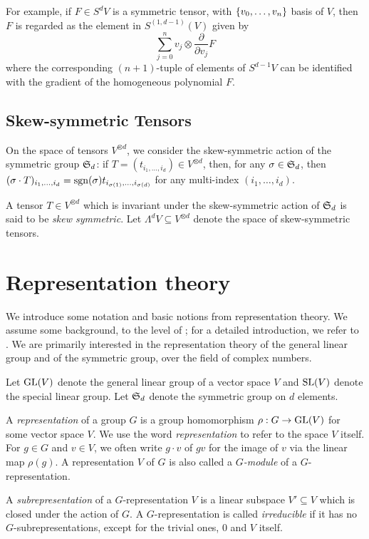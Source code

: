 For example, if $F \in S^d V$ is a symmetric tensor, with $\{v_0 , \ldots , v_n\}$ basis of $V$, then $F$ is regarded as the element in $S^{(1,d-1)}(V)$ given by 
\[
    \sum_{j=0}^n v_j \otimes \textstyle\frac{\partial }{\partial v_j} F
\]
where the corresponding $(n+1)$-tuple of elements of $S^{d-1} V$ can be identified with the gradient of the homogeneous polynomial $F$.

\subsection{Skew-symmetric Tensors}
\label{introduction-subsection-skew_symmetric_tensors}
On the space of tensors $V^{\otimes d}$, we consider the skew-symmetric action of the symmetric group $\mathfrak{S}_d$: if $T = (t_{i_1,\ldots,i_d}) \in V^{\otimes d}$, then, for any $\sigma \in \mathfrak{S}_d$, then $(\sigma \cdot T)_{i_1,\ldots,i_d} = \operatorname{sgn}(\sigma)t_{i_{\sigma(1)},\ldots,i_{\sigma(d)}}$ for any multi-index $(i_1,\ldots,i_d)$.
\begin{definition}
\label{introduction-definition-skew_symmetric_tensors}
A tensor $T \in V^{\otimes d}$ which is invariant under the skew-symmetric action of $\mathfrak{S}_d$ is said to be \emph{skew symmetric}. Let $\Lambda^d V \subseteq V^{\otimes d}$ denote the space of skew-symmetric tensors. 
\end{definition}

\section{Representation theory}
\label{introduction-section-repTheory}

We introduce some notation and basic notions from representation theory. We assume some background, to the level of \cite[Ch.6]{Lan12}; for a detailed introduction, we refer to \cite{FH91}. We are primarily interested in the representation theory of the general linear group and of the symmetric group, over the field of complex numbers.

Let $\mathrm{GL}(V)$ denote the general linear group of a vector space $V$ and $\mathrm{SL}(V)$ denote the special linear group. Let $\mathfrak{S}_d$ denote the symmetric group on $d$ elements. 

\begin{definition}
\label{introduction-definition-grouprepresentation} 
A {\it representation} of a group $G$ is a group homomorphism $\rho : G \to \mathrm{GL}(V)$ for some vector space $V$. We use the word \emph{representation} to refer to the space $V$ itself. For $g \in G$ and $v \in V$, we often write $g \cdot v$ of $gv$ for the image of $v$ via the linear map $\rho(g)$. A representation $V$ of $G$ is also called a {\it $G$-module} of a $G$-representation.

A {\it subrepresentation} of a $G$-representation $V$ is a linear subspace $V' \subseteq V$ which is closed under the action of $G$. A $G$-representation is called {\it irreducible} if it has no $G$-subrepresentations, except for the trivial ones, $0$ and $V$ itself.
\end{definition}

